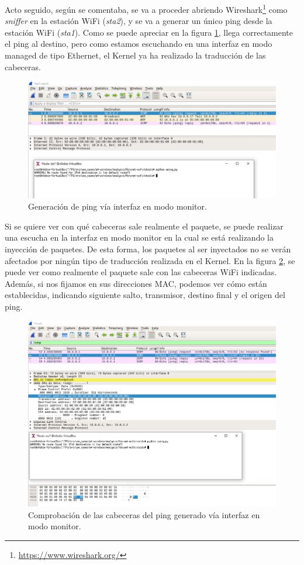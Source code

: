 Acto seguido, según se comentaba, se va a proceder abriendo Wireshark\footnote{\url{https://www.wireshark.org/}} como \textit{sniffer} en la estación WiFi (\textit{sta2}), y se va a generar un único ping desde la estación WiFi (\textit{sta1}). Como se puede apreciar en la figura \ref{fig:future_ping}, llega correctamente el ping al destino, pero como estamos escuchando en una interfaz en modo managed de tipo Ethernet, el Kernel ya ha realizado la traducción de las cabeceras.

\begin{figure}[ht]
    \centering
    \includegraphics[width=14cm]{archivos/img/conclusiones/wping.png}
    \caption{Generación de ping vía interfaz en modo monitor.}
    \label{fig:future_ping}
\end{figure}

Si se quiere ver con qué cabeceras sale realmente el paquete, se puede realizar una escucha en la interfaz en modo monitor en la cual se está realizando la inyección de paquetes. De esta forma, los paquetes al ser inyectados no se verán afectados por ningún tipo de traducción realizada en el Kernel. En la figura \ref{fig:future_ping_hdrs}, se puede ver como realmente el paquete sale con las cabeceras WiFi indicadas. Además, si nos fijamos en sus direcciones MAC, podemos ver cómo están establecidas, indicando siguiente salto, transmisor, destino final y el origen del ping.
\newpage
\begin{figure}[ht]
    \centering
    \includegraphics[width=14cm]{archivos/img/conclusiones/wping_hdrs.png}
    \caption{Comprobación de las cabeceras del ping generado vía interfaz en modo monitor.}
    \label{fig:future_ping_hdrs}
\end{figure}


